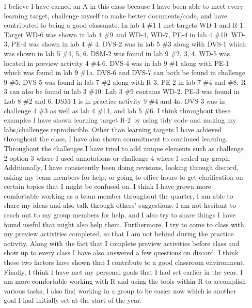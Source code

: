 \documentclass[
  letterpaper,
  DIV=11,
  numbers=noendperiod]{scrartcl}
\begin{document}
I believe I have earned an A in this class because I have been able to
meet every learning target, challenge myself to make better
documents/code, and have contributed to being a good classmate. In lab 4
\#1 I met targets WD-1 and R-1. Target WD-6 was shown in lab 4 \#9 and
WD-4, WD-7, PE-4 in lab 4 \#10. WD-3, PE-4 was shown in lab 4 \# 4.
DVS-2 was in lab 5 \#3 along with DVS-1 which was shown in lab 5 \#4, 5,
6. DSM-2 was found in lab 9 \#2, 3, 4. WD-5 was located in preview
activity 4 \#4-6. DVS-4 was in lab 9 \#1 along with PE-1 which was found
in lab 9 \#1a. DVS-6 and DVS-7 can both be found in challenge 9 \#5.
DVS-5 was found in lab 7 \#2 along with R-3, PE-2 in lab 7 \#4 and \#8.
R-3 can also be found in lab 3 \#10. Lab 3 \#9 contains WD-2. PE-3 was
found in Lab 8 \#2 and 6. DSM-1 is in practice activity 9 \#4 and 4a.
DVS-3 was in challenge 4 \#3 as well as lab 4 \#11, and lab 5 \#6. I
think throughout these examples I have shown learning target R-2 by
using tidy code and making my labs/challenges reproducible. Other than
learning targets I have achieved throughout the class, I have also shown
commitment to continued learning. Throughout the challenges I have tried
to add unique elements such as challenge 2 option 3 where I used
annotations or challenge 4 where I scaled my graph. Additionally, I have
consistently been doing revisions, looking through discord, asking my
team members for help, or going to office hours to get clarification on
certain topics that I might be confused on. I think I have grown more
comfortable working as a team member throughout the quarter, I am able
to share my ideas and also talk through others' suggestions. I am not
hesitant to reach out to my group members for help, and I also try to
share things I have found useful that might also help them. Furthermore,
I try to come to class with my preview activities completed, so that I
am not behind during the practice activity. Along with the fact that I
complete preview activities before class and show up to every class I
have also answered a few questions on discord. I think these two factors
have shown that I contribute to a good classroom environment. Finally, I
think I have met my personal goals that I had set earlier in the year. I
am more comfortable working with R and using the tools within R to
accomplish various tasks, I also find working in a group to be easier
now which is another goal I had initially set at the start of the year.
\end{document}
